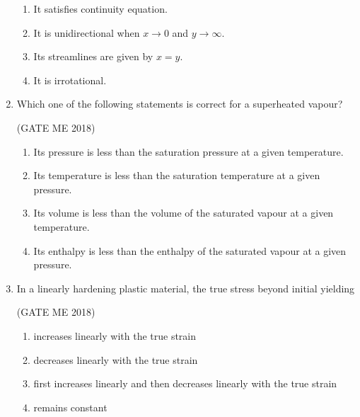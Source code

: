 \documentclass[journal]{IEEEtran}
\numberwithin{equation}{enumi}
\numberwithin{figure}{enumi}
\begin{document}
\begin{enumerate}
\begin{enumerate}
    \item It satisfies continuity equation.
    \item It is unidirectional when \( x \to 0 \) and \( y \to \infty \).
    \item Its streamlines are given by \( x = y \).
    \item It is irrotational.
\end{enumerate}
     \item Which one of the following statements is correct for a superheated vapour?

       \hfill{(GATE ME 2018)}
       
\begin{enumerate}
    \item Its pressure is less than the saturation pressure at a given temperature.
    \item Its temperature is less than the saturation temperature at a given pressure.
    \item Its volume is less than the volume of the saturated vapour at a given temperature.
    \item Its enthalpy is less than the enthalpy of the saturated vapour at a given pressure.
\end{enumerate}
    \item In a linearly hardening plastic material, the true stress beyond initial yielding

  \hfill{(GATE ME 2018)}

\begin{enumerate}
   \item  increases linearly with the true strain
\item  decreases linearly with the true strain
\item  first increases linearly and then decreases linearly with the true strain
\item remains constant
\end{enumerate}


\end{enumerate}
\end{document}
